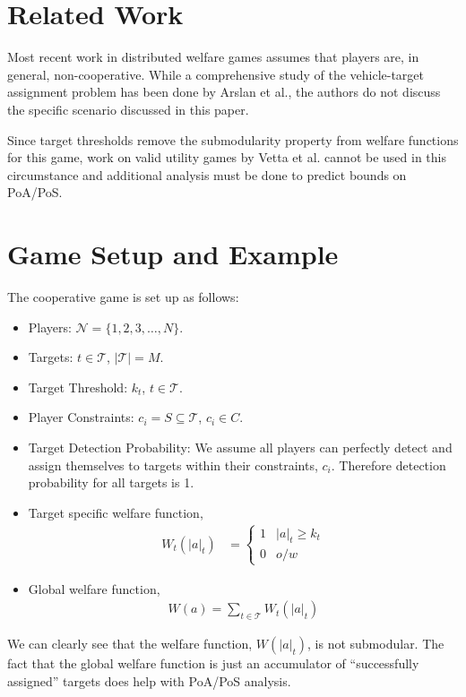 \documentclass[11pt, onecolumn, compsoc, letterpaper]{article}
\newcommand{\Pl}{\mathcal{N}} %
\newcommand{\Ta}{\mathcal{T}} %
\begin{document}
\section{Related Work}
Most recent work in distributed welfare games\cite{Marden2008, Marden2013} assumes that players are, in general, non-cooperative. While a comprehensive study of the vehicle-target assignment problem has been done by Arslan et al.\cite{Arslan2007}, the authors do not discuss the specific scenario discussed in this paper.

Since target thresholds remove the submodularity property from welfare functions for this game, work on valid utility games by Vetta et al.\cite{Vetta2002} cannot be used in this circumstance and additional analysis must be done to predict bounds on PoA/PoS.


\section{Game Setup and Example}
The cooperative game is set up as follows:
\begin{itemize}
	\item Players: $\Pl = \{1,2,3,\ldots, N\}$.
	\item Targets: $t \in \Ta$, $|\Ta| = M$.
	\item Target Threshold: $k_t$, $t \in \Ta$.
	\item Player Constraints: $c_i = S \subseteq \Ta$, $c_i \in C$.
	\item Target Detection Probability: We assume all players can perfectly detect and assign themselves to targets within their constraints, $c_i$. Therefore detection probability for all targets is 1.
	\item Target specific welfare function, 
\begin{align}
	W_t(|a|_t) & = \left\{
	\begin{array}{ll}
		1 & |a|_t \geq k_t\\
		0 & o/w
	\end{array}\right.\label{eq:wf}
\end{align}
	\item Global welfare function,
\begin{align}
	W(a) = \sum\limits_{t \in \Ta} W_t(|a|_t)\label{eq:gwf}
\end{align}
\end{itemize}
We can clearly see that the welfare function, $W(|a|_t)$, is not submodular. The fact that the global welfare function is just an accumulator of ``successfully assigned'' targets does help with PoA/PoS analysis.
\end{document}
